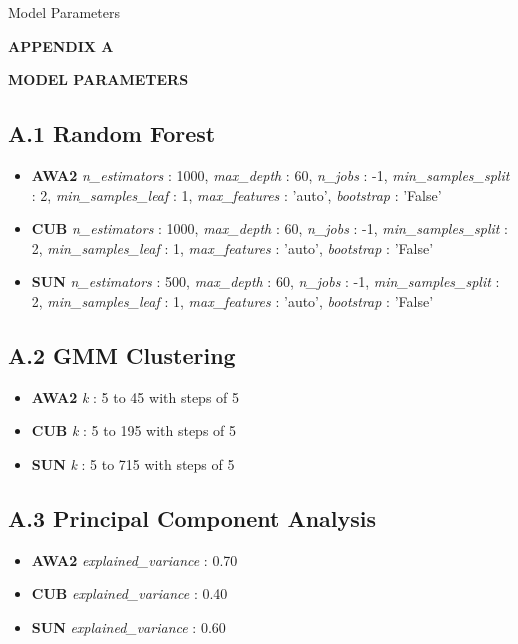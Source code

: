 \newpage


{\qquad\protect{} \hspace{0.5em} Model Parameters
}

\begin{center}
    \textbf{APPENDIX A}

    \MakeUppercase{\textbf{Model Parameters}}
    \vspace*{\baselineskip}
\end{center}

\subsection*{A.1 \hspace{0.5em} Random Forest}

    \begin{itemize}
    \item \textbf{AWA2} \textit{n\_estimators} : 1000, 
        \textit{max\_depth} : 60, 
        \textit{n\_jobs} : -1,
        \textit{min\_samples\_split} : 2,
        \textit{min\_samples\_leaf} : 1,
        \textit{max\_features} : 'auto',
        \textit{bootstrap} : 'False'
     \item \textbf{CUB} \textit{n\_estimators} : 1000, 
        \textit{max\_depth} : 60, 
        \textit{n\_jobs} : -1,
        \textit{min\_samples\_split} : 2,
        \textit{min\_samples\_leaf} : 1,
        \textit{max\_features} : 'auto',
        \textit{bootstrap} : 'False'
     \item \textbf{SUN} \textit{n\_estimators} : 500, 
        \textit{max\_depth} : 60, 
        \textit{n\_jobs} : -1,
        \textit{min\_samples\_split} : 2,
        \textit{min\_samples\_leaf} : 1,
        \textit{max\_features} : 'auto',
        \textit{bootstrap} : 'False'
    \end{itemize}

\subsection*{A.2 \hspace{0.5em} GMM Clustering}

 \begin{itemize}
     \item \textbf{AWA2} \textit{k} : 5 to 45 with steps of 5
     \item \textbf{CUB} \textit{k} : 5 to 195 with steps of 5
     \item \textbf{SUN} \textit{k} : 5 to 715 with steps of 5
 \end{itemize}

\subsection*{A.3 \hspace{0.5em} Principal Component Analysis}

 \begin{itemize}
     \item \textbf{AWA2} \textit{explained\_variance} : 0.70
     \item \textbf{CUB} \textit{explained\_variance} : 0.40
     \item \textbf{SUN} \textit{explained\_variance} : 0.60
 \end{itemize}

\newpage
